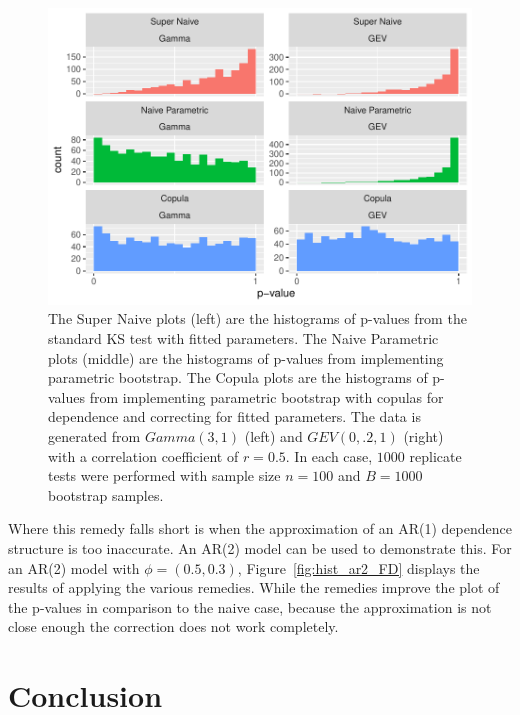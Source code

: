 \documentclass[12pt, letterpaper, titlepage]{article}
\begin{document}
\begin{figure}[tbp]
  \centering
  \includegraphics{hist_gamma_gev_FD}
  \caption{The Super Naive plots (left) are the histograms of p-values from the 
  standard KS test with fitted parameters. The Naive Parametric plots (middle) 
  are the histograms of p-values from implementing parametric bootstrap. The 
  Copula plots are the histograms of p-values from implementing parametric 
  bootstrap with copulas for dependence and correcting for fitted parameters. 
  The data is generated from $Gamma(3, 1)$ (left) and $GEV(0, .2, 1)$ (right) 
  with a correlation coefficient of $r = 0.5$. In each case, $1000$ replicate 
  tests were performed with sample size $n = 100$ and $B = 1000$ bootstrap 
  samples.}
  \label{fig:hist_gamma__gev_FD}
\end{figure}


Where this remedy falls short is when the approximation of an AR(1) dependence 
structure is too inaccurate. An AR(2) model can be used to demonstrate this. For 
an AR(2) model with $\phi = (0.5, 0.3)$, Figure~\ref{fig:hist_ar2_FD} 
displays the results of applying the various remedies. While the remedies 
improve the plot of the p-values in comparison to the naive case, because the 
approximation is not close enough the correction does not work completely.


\section{Conclusion}
\label{sec:conclusion}
\end{document}
